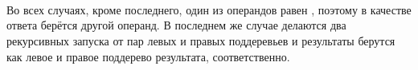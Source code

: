 \begin{code}
\\
\> \AgdaSymbol{(} \AgdaSymbol{\{}\AgdaSymbol{\}} \AgdaSymbol{\{}\AgdaSymbol{\}}  \AgdaSymbol{)}  \AgdaSymbol{(}   \AgdaSymbol{)}\AgdaSymbol{)} \AgdaSymbol{=}     \<%
\\
\>           \AgdaSymbol{(}  \AgdaSymbol{)} \AgdaSymbol{=} \<[53]%
\>[53]\<%
\\
\>[0]\<[2]%
\>[2] \AgdaSymbol{(}  \AgdaSymbol{)}   \AgdaSymbol{(}  \AgdaSymbol{)}  \<%
\end{code}

Во всех случаях, кроме последнего, один из операндов равен
, поэтому в качестве ответа берётся другой
операнд. В последнем же случае делаются два рекурсивных запуска от 
пар левых и правых поддеревьев и результаты берутся как левое и правое
поддерево результата, соответственно.
  

